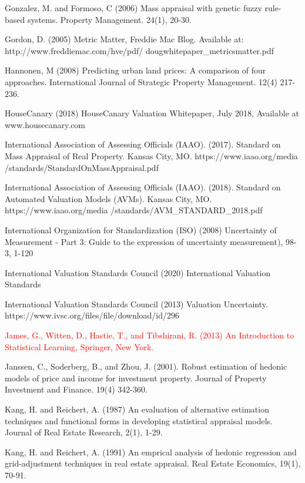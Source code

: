 \documentclass[colTwo]{anon}
\theoremstyle{definition}
\begin{document}
\begin{thebibliography}{50}
\harvarditem{}{}{}Gonzalez, M. and Formoso, C (2006) Mass appraisal with genetic fuzzy rule-based systems. Property Management. 24(1), 20-30. 

\harvarditem{}{}{}Gordon, D. (2005) Metric Matter, Freddie Mac Blog. Available at: http://www.freddiemac.com/hve/pdf/ dougwhitepaper\_metricsmatter.pdf

\harvarditem{}{}{}Hannonen, M (2008) Predicting urban land prices: A comparison of four approaches. International Journal of Strategic Property Management. 12(4) 217-236. 

\harvarditem{}{}{}HouseCanary (2018) HouseCanary Valuation Whitepaper, July 2018, Available at www.housecanary.com

\harvarditem{}{}{}International Association of Assessing Officials (IAAO). (2017). Standard on Mass Appraisal of Real Property. Kansas City, MO. https://www.iaao.org/media /standards/StandardOnMassAppraisal.pdf

\harvarditem{}{}{}International Association of Assessing Officials (IAAO). (2018). Standard on Automated Valuation Models (AVMs). Kansas City, MO. https://www.iaao.org/media /standards/AVM\_STANDARD\_2018.pdf

\harvarditem{}{}{} International Organization for Standardization (ISO) (2008) Uncertainty of Measurement - Part 3: Guide to the expression of uncertainty measurement), 98-3, 1-120

\harvarditem{}{}{}International Valuation Standards Council (2020) International Valuation Standards 

\harvarditem{}{}{}International Valuation Standards Council (2013) Valuation Uncertainty. https://www.ivsc.org/files/file/download/id/296

\textcolor{red}{\harvarditem{}{}{}James, G., Witten, D., Hastie, T., and Tibshirani, R.  (2013) An Introduction to Statistical Learning, Springer, New York. } 

\harvarditem{}{}{}Janssen, C., Soderberg, B., and Zhou, J. (2001). Robust estimation of hedonic models of price and income for investment property. Journal of Property Investment and Finance. 19(4) 342-360. 

\harvarditem{}{}{}Kang, H. and Reichert, A. (1987) An evaluation of alternative estimation techniques and functional forms in developing statistical appraisal models. Journal of Real Estate Research, 2(1), 1-29. 

\harvarditem{}{}{}Kang, H. and Reichert, A. (1991) An emprical analysis of hedonic regression and grid-adjustment techniques in real estate appraisal. Real Estate Economics, 19(1), 70-91. 


\end{thebibliography}
\end{document}
